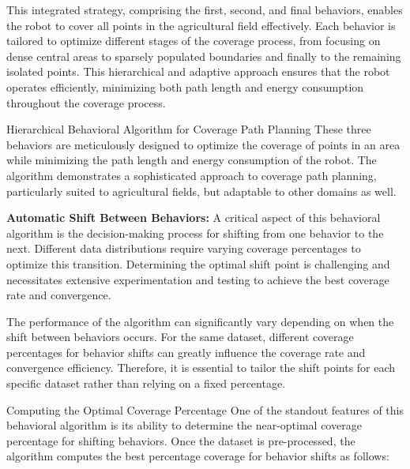 \vspace*{6mm}   

This integrated strategy, comprising the first, second, and final behaviors, enables the robot to cover all points in the agricultural field effectively. Each behavior is tailored to optimize different stages of the coverage process, from focusing on dense central areas to sparsely populated boundaries and finally to the remaining isolated points. This hierarchical and adaptive approach ensures that the robot operates efficiently, minimizing both path length and energy consumption throughout the coverage process.


\vspace*{6mm}   



Hierarchical Behavioral Algorithm for Coverage Path Planning
These three behaviors are meticulously designed to optimize the coverage of points in an area while minimizing the path length and energy consumption of the robot. The algorithm demonstrates a sophisticated approach to coverage path planning, particularly suited to agricultural fields, but adaptable to other domains as well.

\vspace*{6mm}   

\textbf{Automatic Shift Between Behaviors: }
A critical aspect of this behavioral algorithm is the decision-making process for shifting from one behavior to the next. Different data distributions require varying coverage percentages to optimize this transition. Determining the optimal shift point is challenging and necessitates extensive experimentation and testing to achieve the best coverage rate and convergence.

\vspace*{6mm}   

The performance of the algorithm can significantly vary depending on when the shift between behaviors occurs. For the same dataset, different coverage percentages for behavior shifts can greatly influence the coverage rate and convergence efficiency. Therefore, it is essential to tailor the shift points for each specific dataset rather than relying on a fixed percentage.

\vspace*{6mm}   

Computing the Optimal Coverage Percentage
One of the standout features of this behavioral algorithm is its ability to determine the near-optimal coverage percentage for shifting behaviors. Once the dataset is pre-processed, the algorithm computes the best percentage coverage for behavior shifts as follows:

